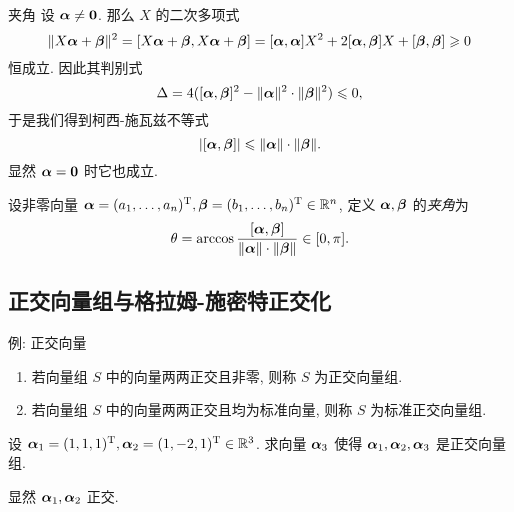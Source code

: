 \begin{frame}{夹角}
	\onslide<+->
	设 $\bma\neq{\bf0}$.
	\onslide<+->
	那么 $X$ 的二次多项式
	\[\|X\bma+\bmb\|^2=[X\bma+\bmb,X\bma+\bmb]
	=[\bma,\bma]X^2+2[\bma,\bmb]X+[\bmb,\bmb]\ge0\]
	恒成立.
	\onslide<+->
	因此其判别式
	\[\Delta=4([\bma,\bmb]^2-\|\bma\|^2\cdot\|\bmb\|^2)\le 0,\]
	\onslide<+->
	于是我们得到柯西-施瓦兹不等式
	\[|[\bma,\bmb]|\le \|\bma\|\cdot\|\bmb\|.\]
	\onslide<+->
	显然 $\bma={\bf0}$ 时它也成立.
	\onslide<+->
	\begin{definition}
		设非零向量 $\bma=(a_1,\dots,a_n)^\rmT,\bmb=(b_1,\dots,b_n)^\rmT\in\BR^n$, 定义 $\bma,\bmb$ 的\emph{夹角}为
		\[\theta=\arccos\dfrac{[\bma,\bmb]}{\|\bma\|\cdot\|\bmb\|}\in[0,\pi].\]
	\end{definition}
\end{frame}

\subsection{正交向量组与格拉姆-施密特正交化}

\begin{frame}{例: 正交向量}
	\onslide<+->
	\begin{definition}
		\begin{enumerate}
			\item 若向量组 $S$ 中的向量两两正交且非零, 则称 $S$ 为正交向量组.
			\item 若向量组 $S$ 中的向量两两正交且均为标准向量, 则称 $S$ 为标准正交向量组.
		\end{enumerate}
	\end{definition}
	\onslide<+->
	\begin{example}
		设 $\bma_1=(1,1,1)^\rmT,\bma_2=(1,-2,1)^\rmT\in\BR^3$.
		求向量 $\bma_3$ 使得 $\bma_1,\bma_2,\bma_3$ 是正交向量组.
	\end{example}
	\onslide<+->
	\begin{solution}
		显然 $\bma_1,\bma_2$ 正交.
		\onslide<+->{%
			故可取 $\bma_3=(1,0,-1)^\rmT$.
		}
	\end{solution}
\end{frame}


